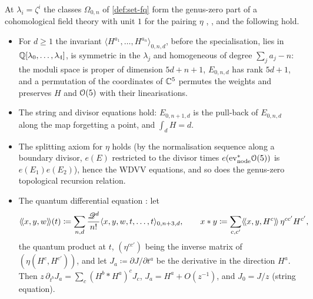 \begin{thm}
\label{thm:set-G0}
At $\lambda_i=\zeta^i$ the classes $\Omega_{0,n}$ of \cref{def:set-fq} form the genus-zero part of a cohomological field theory with unit $1$ for the pairing $\eta$ \cite[Section~4.1]{GJR18}, \cite[Def.~0.3]{PPZ15}, and the following hold.
\begin{itemize}
\item[(a)] For $d\geq1$ the invariant $\langle H^{a_1},\dots,H^{a_n}\rangle_{0,n,d}$, before the specialisation, lies in $\mathbb{Q}[\lambda_0,\dots,\lambda_4]$, is symmetric in the $\lambda_j$ and homogeneous of degree $\sum_ja_j-n$: the moduli space is proper of dimension $5d+n+1$, $E_{0,n,d}$ has rank $5d+1$, and a permutation of the coordinates of $\mathbb{C}^5$ permutes the weights and preserves $H$ and $\mathcal{O}(5)$ with their linearisations.
\item[(b)] The string and divisor equations hold: $E_{0,n+1,d}$ is the pull-back of $E_{0,n,d}$ along the map forgetting a point, and $\int_dH=d$.
\item[(c)] The splitting axiom for $\eta$ holds (by the normalisation sequence along a boundary divisor, $e(E)$ restricted to the divisor times $e(\mathrm{ev}_{\mathrm{node}}^*\mathcal{O}(5))$ is $e(E_1)e(E_2)$), hence the WDVV equations, and so does the genus-zero topological recursion relation.
\item[(d)] The quantum differential equation \cite[Section~5.2, (14)]{GJR18}: let
\[
\langle\!\langle x,y,w\rangle\!\rangle(t)\coloneqq\sum_{n,d}\frac{\mathscr{Q}^d}{n!}\langle x,y,w,t,\dots,t\rangle_{0,n+3,d},\qquad x*y\coloneqq\sum_{c,c'}\langle\!\langle x,y,H^c\rangle\!\rangle\,\eta^{cc'}H^{c'},
\]
the quantum product at $t$, $(\eta^{cc'})$ being the inverse matrix of $(\eta(H^c,H^{c'}))$, and let $J_a\coloneqq\partial J/\partial t^a$ be the derivative in the direction $H^a$. Then $z\,\partial_{t^b}J_a=\sum_c(H^b*H^a)^cJ_c$, $J_a=H^a+O(z^{-1})$, and $J_0=J/z$ (string equation).
\end{itemize}
\end{thm}


